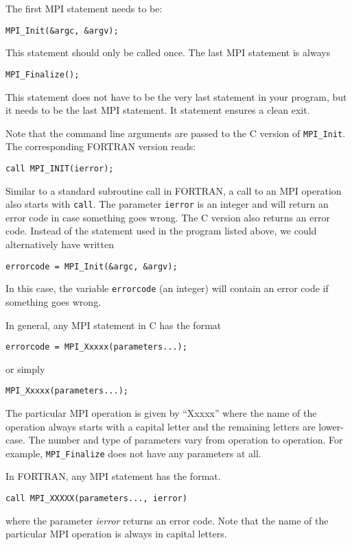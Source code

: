 The first MPI statement needs to be:
\begin{lstlisting}[style=c]
  MPI_Init(&argc, &argv);
\end{lstlisting}
This statement should only be called once. The last MPI statement is always
\begin{lstlisting}[style=c]
  MPI_Finalize();
\end{lstlisting}
This statement does not have to be the very last statement in your program, but
it needs to be the last MPI statement. It statement ensures a clean exit.

Note that the command line arguments are passed to the C version of
\texttt{MPI\_Init}. The corresponding FORTRAN version reads:
\begin{lstlisting}[style=fortran]
  call MPI_INIT(ierror);
\end{lstlisting}
Similar to a standard subroutine call in FORTRAN, a call to an MPI operation
also starts with \texttt{call}. The parameter \texttt{ierror} is an integer and
will return an error code in case something goes wrong. The C version also
returns an error code. Instead of the statement used in the program listed
above, we could alternatively have written
\begin{lstlisting}[style=c]
  errorcode = MPI_Init(&argc, &argv);
\end{lstlisting}
In this case, the variable \texttt{errorcode} (an integer) will contain an error
code if something goes wrong.

In general, any MPI statement in C has the format
\begin{lstlisting}[style=c]
  errorcode = MPI_Xxxxx(parameters...);
\end{lstlisting}
or simply
\begin{lstlisting}[style=c]
  MPI_Xxxxx(parameters...);
\end{lstlisting}
The particular MPI operation is given by ``Xxxxx'' where the name of the operation
always starts with a capital letter and the remaining letters are lower-case.
The number and type of parameters vary from operation to operation. For example,
\texttt{MPI\_Finalize} does not have any parameters at all.

In FORTRAN, any MPI statement has the format.
\begin{lstlisting}[style=c]
  call MPI_XXXXX(parameters..., ierror)
\end{lstlisting}
where the parameter \emph{ierror} returns an error code. Note that the name of
the particular MPI operation is always in capital letters.

